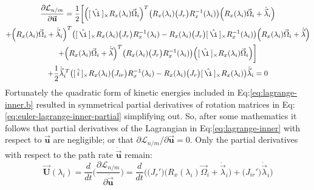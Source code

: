 \begin{multline}\label{eq:euler-lagrange-inner-partial}
\frac{\partial\mathcal{L}_{n/m}}{\partial\vec{\mathbf{u}}}=\frac{1}{2}\bigg[\Big([\hspace{2pt}\hat{\i}\hspace{2pt}]_\times R_x(\lambda_i)\vec{\Omega}_i\Big)^T\big(R_x(\lambda_i)\big(J_{r}\big)R_x^{-1}(\lambda_i)\big)\Big(R_x(\lambda_i)\vec{\Omega}_i+\dot{\vec{\lambda}}_i\Big)
\\
+\Big(R_x(\lambda_i)\vec{\Omega}_i+\dot{\vec{\lambda}}_i\Big)^T\big([\hspace{2pt}\hat{\i}\hspace{2pt}]_\times R_x(\lambda_i)\big(J_r\big)R_x^{-1}(\lambda_i)-R_x(\lambda_i)\big(J_r\big)[\hspace{2pt}\hat{\i}\hspace{2pt}]_\times R_x^{-1}(\lambda_i)\big)\Big(R_x(\lambda_i)\vec{\Omega}_i+\dot{\vec{\lambda}}\Big)
\\
+\Big(R_x(\lambda_i)\vec{\Omega}_i+\dot{\vec{\lambda}}\Big)^T\big(R_x(\lambda_i)\big(J_r\big)R_x^{-1}(\lambda_i)\big)\Big([\hspace{2pt}\hat{\i}\hspace{2pt}]_\times R_x(\lambda_i)\vec{\Omega}_i\Big)\bigg]
\\
+\frac{1}{2}\dot{\vec{\lambda}}_i^{\hspace{2pt}T}\big([\hspace{2pt}\hat{i}\hspace{2pt}]_\times R_x(\lambda_i)\big(J_{ir}\big)R_x^{-1}(\lambda_i)-R_x(\lambda_i)\big(J_r\big)[\hspace{2pt}\hat{\i}\hspace{2pt}]_\times R_x(\lambda_i)\big)\dot{\vec{\lambda}}_i=0
\end{multline}
Fortunately the quadratic form of kinetic energies included in Eq:\ref{eq:lagrange-inner.b} resulted in symmetrical partial derivatives of rotation matrices in Eq:\ref{eq:euler-lagrange-inner-partial} simplifying out. So, after some mathematics it follows that partial derivatives of the Lagrangian in Eq:\ref{eq:lagrange-inner} with respect to $\vec{\mathbf{u}}$ are negligible; or that $\partial\mathcal{L}_{n/m}/\partial\vec{\mathbf{u}}= 0$. Only the partial derivatives with respect to the path rate $\dot{\vec{\mathbf{u}}}$ remain:
\begin{equation}\label{eq:3.42b}
\vec{\mathbf{U}}(\lambda_i)=\frac{d}{dt}\bigg(\frac{\partial \mathcal{L}_{n/m}}{\partial \dot{\vec{\mathbf{u}}}}\bigg)=\frac{d}{dt}\bigg(\big(J_{r}'\big)\Big(R_x(\lambda_i)\vec{\Omega}_i+\dot{\vec{\lambda}}_i\Big)+\big(J_{ir}'\big)\dot{\vec{\lambda}}_i\bigg)
\end{equation}
